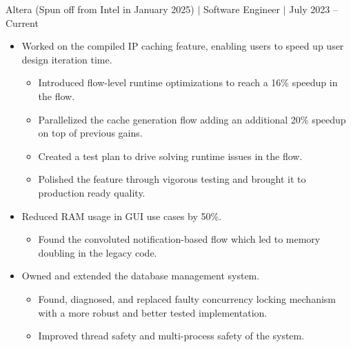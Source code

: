\documentclass[12pt]{article}
\newcommand{\textDate}[3]{\noindent#1 $|$ #2 $|$ {\color{textGray} #3}}
\begin{document}
    \textDate{Altera (Spun off from Intel in January 2025)}{Software Engineer}{July 2023 -- Current}
    \begin{small}
        \begin{itemize}
            \itemsep0em 

            \item {\color{textGray} Worked on the compiled IP caching feature, enabling users to speed up user design iteration time.}
                \begin{itemize}[label=$\circ$,topsep=-5px,partopsep=0px]
                    \itemsep0em 
                    \item {\color{textGray} Introduced flow-level runtime optimizations to reach a 16\% speedup in the flow.}
                    \item {\color{textGray} Parallelized the cache generation flow adding an additional 20\% speedup on top of previous gains.}
                    \item {\color{textGray} Created a test plan to drive solving runtime issues in the flow.}
                    \item {\color{textGray} Polished the feature through vigorous testing and brought it to production ready quality.}
                \end{itemize}

            \item {\color{textGray} Reduced RAM usage in GUI use cases by 50\%.}
                \begin{itemize}[label=$\circ$,topsep=-5px,partopsep=0px]
                    \itemsep0em 
                    \item {\color{textGray} Found the convoluted notification-based flow which led to memory doubling in the legacy code.}
                \end{itemize}

            \item {\color{textGray} Owned and extended the database management system.}
                \begin{itemize}[label=$\circ$,topsep=-5px,partopsep=0px]
                    \itemsep0em 
                    \item {\color{textGray} Found, diagnosed, and replaced faulty concurrency locking mechanism with a more robust and better tested implementation.}
                    \item {\color{textGray} Improved thread safety and multi-process safety of the system.}
                \end{itemize}


\end{itemize}
\end{small}
\end{document}
